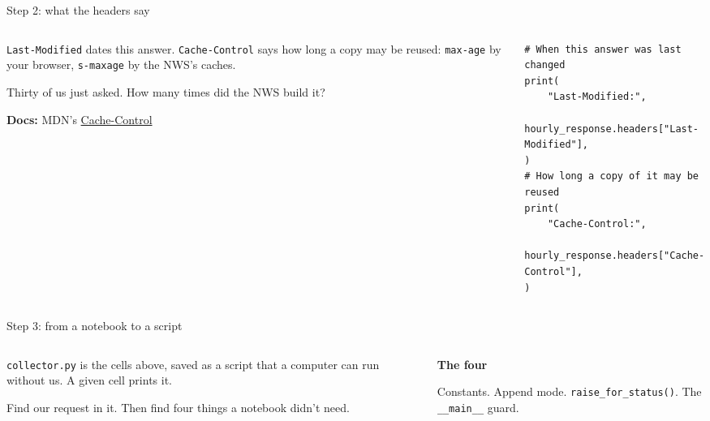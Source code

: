 \documentclass[9pt,aspectratio=169]{beamer}
\begin{document}
\begin{frame}[fragile]{Step 2: what the headers say}
    \begin{columns}[T]
        \begin{column}{0.37\textwidth}
            \texttt{Last-Modified} dates this answer. \texttt{Cache-Control} says how long a copy may be reused: \texttt{max-age} by your browser, \texttt{s-maxage} by the NWS's caches.

            \medskip
            Thirty of us just asked. How many times did the NWS build it?

            \medskip
            {\scriptsize\textbf{Docs:} MDN's \href{https://developer.mozilla.org/en-US/docs/Web/HTTP/Reference/Headers/Cache-Control}{Cache-Control}\par}
        \end{column}
        \begin{column}{0.6\textwidth}
\begin{lstlisting}
# When this answer was last changed
print(
    "Last-Modified:",
    hourly_response.headers["Last-Modified"],
)
# How long a copy of it may be reused
print(
    "Cache-Control:",
    hourly_response.headers["Cache-Control"],
)
\end{lstlisting}
        \end{column}
    \end{columns}
\end{frame}

\begin{frame}{Step 3: from a notebook to a script}
    \begin{columns}[T]
        \begin{column}{0.6\textwidth}
            \texttt{collector.py} is the cells above, saved as a script that a computer can run without us. A given cell prints it.

            \medskip
            Find our request in it. Then find four things a notebook didn't need.
        \end{column}
        \begin{column}{0.35\textwidth}
            \textbf{The four}\\[2pt]
            {\footnotesize Constants. Append mode. \texttt{raise\_for\_status()}. The \texttt{\_\_main\_\_} guard.\par}
        \end{column}
    \end{columns}
\end{frame}
\end{document}
